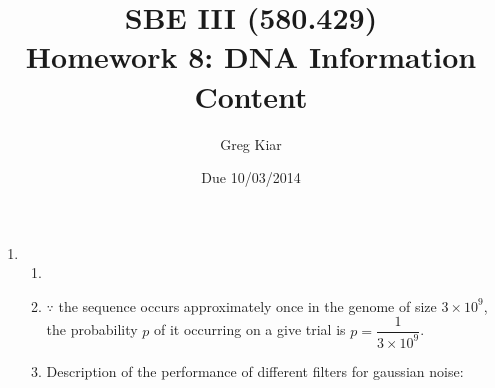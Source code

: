\documentclass[10pt]{article}
\begin{document}
\title{
\vspace{-19mm}
SBE III (580.429)\\
Homework 8: DNA Information Content}
\author{Greg Kiar}
\date{Due 10/03/2014}

\maketitle

\begin{enumerate}

\item  
%
\begin{enumerate}
\item 

\item $\because$ the sequence occurs approximately once in the genome of size $3 \times 10^9$, the probability $p$ of it occurring on a give trial is  $p = \dfrac{1}{3 \times 10^9}$.

\item Description of the performance of different filters for gaussian noise:

\end{enumerate}


\end{enumerate}
\end{document}
